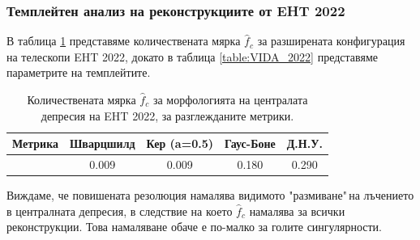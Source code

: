 \subsubsection{Темплейтен анализ на реконструкциите от EHT 2022}

В таблица \ref{table:f_2022} представяме количествената мярка $\hat{f}_c$ за разширената конфигурация на телескопи EHT 2022, докато в таблица \ref{table:VIDA_2022} представяме параметрите на темплейтите.

\begin{table}[h!]
	\centering
	\begin{tabular}{||c|c|c|c|c||}
		\hline
		{Метрика} & {Шварцшилд}&{Кер (a=0.5)}&{Гаус-Боне}&{Д.Н.У.}
		\\\hline
		{\thead{$\hat{f}_c$}} & 0.009&0.009&0.180&0.290
		\\\hline
	\end{tabular}
	\caption[Количествената мярка $\hat{f}_c$ за морфологията на централата депресия на EHT 2022]{\small Количествената мярка $\hat{f}_c$ за морфологията на централата депресия на EHT 2022, за разглежданите метрики.}
	\label{table:f_2022}
\end{table}
Виждаме, че повишената резолюция намалява видимото "размиване"$\,$на лъчението в централната депресия, в следствие на което $\hat{f}_c$ намалява за всички реконструкции. Това намаляване обаче е по-малко за голите сингулярности. 
